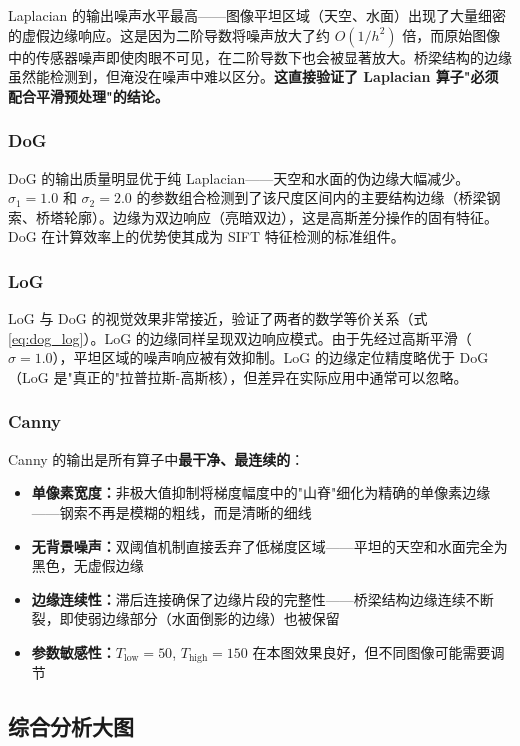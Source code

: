 \documentclass[12pt,a4paper]{ctexart}
\begin{document}
Laplacian 的输出噪声水平最高——图像平坦区域（天空、水面）出现了大量细密的虚假边缘响应。这是因为二阶导数将噪声放大了约 $O(1/h^2)$ 倍，而原始图像中的传感器噪声即使肉眼不可见，在二阶导数下也会被显著放大。桥梁结构的边缘虽然能检测到，但淹没在噪声中难以区分。\textbf{这直接验证了 Laplacian 算子"必须配合平滑预处理"的结论。}

\subsubsection*{DoG}

DoG 的输出质量明显优于纯 Laplacian——天空和水面的伪边缘大幅减少。$\sigma_1=1.0$ 和 $\sigma_2=2.0$ 的参数组合检测到了该尺度区间内的主要结构边缘（桥梁钢索、桥塔轮廓）。边缘为双边响应（亮暗双边），这是高斯差分操作的固有特征。DoG 在计算效率上的优势使其成为 SIFT 特征检测的标准组件。

\subsubsection*{LoG}

LoG 与 DoG 的视觉效果非常接近，验证了两者的数学等价关系（式 \ref{eq:dog_log}）。LoG 的边缘同样呈现双边响应模式。由于先经过高斯平滑（$\sigma=1.0$），平坦区域的噪声响应被有效抑制。LoG 的边缘定位精度略优于 DoG（LoG 是"真正的"拉普拉斯-高斯核），但差异在实际应用中通常可以忽略。

\subsubsection*{Canny}

Canny 的输出是所有算子中\textbf{最干净、最连续的}：
\begin{itemize}
    \item \textbf{单像素宽度：}非极大值抑制将梯度幅度中的"山脊"细化为精确的单像素边缘——钢索不再是模糊的粗线，而是清晰的细线
    \item \textbf{无背景噪声：}双阈值机制直接丢弃了低梯度区域——平坦的天空和水面完全为黑色，无虚假边缘
    \item \textbf{边缘连续性：}滞后连接确保了边缘片段的完整性——桥梁结构边缘连续不断裂，即使弱边缘部分（水面倒影的边缘）也被保留
    \item \textbf{参数敏感性：}$T_{\text{low}}=50$, $T_{\text{high}}=150$ 在本图效果良好，但不同图像可能需要调节
\end{itemize}

\subsection{综合分析大图}
\end{document}

